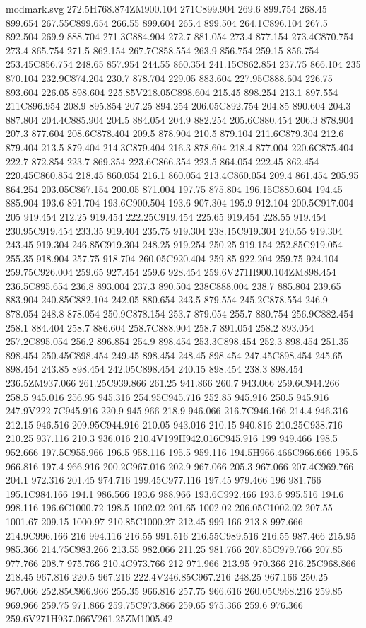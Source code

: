 \begin{filecontents}[noheader]{modmark.svg}
272.5H768.874ZM900.104 271C899.904 269.6 899.754 268.45 899.654 267.55C899.654 266.55 899.604 265.4 899.504 264.1C896.104 267.5 892.504 269.9 888.704 271.3C884.904 272.7 881.054 273.4 877.154 273.4C870.754 273.4 865.754 271.5 862.154 267.7C858.554 263.9 856.754 259.15 856.754 253.45C856.754 248.65 857.954 244.55 860.354 241.15C862.854 237.75 866.104 235 870.104 232.9C874.204 230.7 878.704 229.05 883.604 227.95C888.604 226.75 893.604 226.05 898.604 225.85V218.05C898.604 215.45 898.254 213.1 897.554 211C896.954 208.9 895.854 207.25 894.254 206.05C892.754 204.85 890.604 204.3 887.804 204.4C885.904 204.5 884.054 204.9 882.254 205.6C880.454 206.3 878.904 207.3 877.604 208.6C878.404 209.5 878.904 210.5 879.104 211.6C879.304 212.6 879.404 213.5 879.404 214.3C879.404 216.3 878.604 218.4 877.004 220.6C875.404 222.7 872.854 223.7 869.354 223.6C866.354 223.5 864.054 222.45 862.454 220.45C860.854 218.45 860.054 216.1 860.054 213.4C860.054 209.4 861.454 205.95 864.254 203.05C867.154 200.05 871.004 197.75 875.804 196.15C880.604 194.45 885.904 193.6 891.704 193.6C900.504 193.6 907.304 195.9 912.104 200.5C917.004 205 919.454 212.25 919.454 222.25C919.454 225.65 919.454 228.55 919.454 230.95C919.454 233.35 919.404 235.75 919.304 238.15C919.304 240.55 919.304 243.45 919.304 246.85C919.304 248.25 919.254 250.25 919.154 252.85C919.054 255.35 918.904 257.75 918.704 260.05C920.404 259.85 922.204 259.75 924.104 259.75C926.004 259.65 927.454 259.6 928.454 259.6V271H900.104ZM898.454 236.5C895.654 236.8 893.004 237.3 890.504 238C888.004 238.7 885.804 239.65 883.904 240.85C882.104 242.05 880.654 243.5 879.554 245.2C878.554 246.9 878.054 248.8 878.054 250.9C878.154 253.7 879.054 255.7 880.754 256.9C882.454 258.1 884.404 258.7 886.604 258.7C888.904 258.7 891.054 258.2 893.054 257.2C895.054 256.2 896.854 254.9 898.454 253.3C898.454 252.3 898.454 251.35 898.454 250.45C898.454 249.45 898.454 248.45 898.454 247.45C898.454 245.65 898.454 243.85 898.454 242.05C898.454 240.15 898.454 238.3 898.454 236.5ZM937.066 261.25C939.866 261.25 941.866 260.7 943.066 259.6C944.266 258.5 945.016 256.95 945.316 254.95C945.716 252.85 945.916 250.5 945.916 247.9V222.7C945.916 220.9 945.966 218.9 946.066 216.7C946.166 214.4 946.316 212.15 946.516 209.95C944.916 210.05 943.016 210.15 940.816 210.25C938.716 210.25 937.116 210.3 936.016 210.4V199H942.016C945.916 199 949.466 198.5 952.666 197.5C955.966 196.5 958.116 195.5 959.116 194.5H966.466C966.666 195.5 966.816 197.4 966.916 200.2C967.016 202.9 967.066 205.3 967.066 207.4C969.766 204.1 972.316 201.45 974.716 199.45C977.116 197.45 979.466 196 981.766 195.1C984.166 194.1 986.566 193.6 988.966 193.6C992.466 193.6 995.516 194.6 998.116 196.6C1000.72 198.5 1002.02 201.65 1002.02 206.05C1002.02 207.55 1001.67 209.15 1000.97 210.85C1000.27 212.45 999.166 213.8 997.666 214.9C996.166 216 994.116 216.55 991.516 216.55C989.516 216.55 987.466 215.95 985.366 214.75C983.266 213.55 982.066 211.25 981.766 207.85C979.766 207.85 977.766 208.7 975.766 210.4C973.766 212 971.966 213.95 970.366 216.25C968.866 218.45 967.816 220.5 967.216 222.4V246.85C967.216 248.25 967.166 250.25 967.066 252.85C966.966 255.35 966.816 257.75 966.616 260.05C968.216 259.85 969.966 259.75 971.866 259.75C973.866 259.65 975.366 259.6 976.366 259.6V271H937.066V261.25ZM1005.42 
\end{filecontents}
